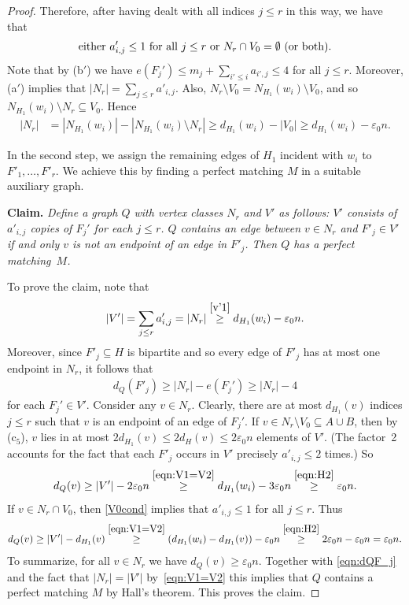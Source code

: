 \documentclass{memo-l}
\def\eps{\varepsilon}
\def\epszero{\eps_0}
\numberwithin{section}{chapter}
\numberwithin{equation}{section}
\numberwithin{firstthm}{section}
\numberwithin{figure}{section}
\begin{document}
{\begin{proof}
Therefore, after having dealt with all indices $j\le r$ in this way, we have that
\begin{align}
\textrm{either $a'_{i,j} \le 1$ for all $j \le r$ or $ N_r \cap V_0 = \emptyset$ (or both).} \label{V0cond}
\end{align}
Note that by (b$'$) we have $e(F_j') \le m_j + \sum_{i'\le i} a_{i',j} \le 4$ for all $j\le r$.
Moreover, (a$'$) implies that $|N_r| = \sum_{j \le r}  a'_{i,j}$.
Also, $N_r  \setminus V_0=N_{H_1}(w_i) \setminus V_0$, and so $N_{H_1}(w_i) \setminus N_r  \subseteq V_0$.
Hence
\begin{align}
|N_r| & = 
| N_{H_1}(w_i) | - | N_{H_1}(w_i) \setminus N_r | 
\ge d_{H_1}(w_i) - |V_0| \ge d_{H_1}(w_i) - \epszero n. 
\label{v'1}
\end{align}

In the second step, we assign the remaining edges of $H_1$ incident with $w_i$ to $F'_1,\dots,F'_r$.
We achieve this by finding a perfect matching $M$ in a suitable auxiliary graph.

\medskip

\noindent
{\bf Claim.} \emph{Define a graph $Q$ with vertex classes $N_r$ and $V'$ as follows:
$V'$ consists of $a'_{i,j}$ copies of $F_j'$ for each $ j \le r$.
$Q$ contains an edge between $v \in N_r$ and $F'_j \in V'$ if and only $v$ is not an endpoint of an edge in $F'_j$.
Then $Q$ has a perfect matching~$M$.}

\smallskip

\noindent
To prove the claim, note that 
\begin{align}\label{eqn:V1=V2}
	|V'| = \sum_{j \le r} a'_{i,j} = |N_r|  \overset{\eqref{v'1}}{\ge} d_{H_1}(w_i) - \epszero n.  
\end{align}
Moreover, since $F'_j\subseteq H$ is bipartite and so every edge of $F'_j$ has at most one endpoint in $N_r$,
it follows that
\begin{align}
d_{Q} (F'_j) \geq |N_r| - e(F_j')  \ge |N_r| -4 \label{eqn:dQF_j}
\end{align}
for each $F_j' \in V'$.
Consider any $v \in N_r$. Clearly, there are at most $d_{H_1}(v)$ indices $j\le r$ such that $v$ is an endpoint of an
edge of $F_j'$. If $v \in N_r \setminus V_0 \subseteq A \cup B$, then by (c$_5$), $v$ lies in at most
$2 d_{H_1}(v) \le 2 d_{H}(v)\le 2 \epszero n$ elements of $V'$. (The factor~2 accounts for the fact that each $F'_j$ occurs in
$V'$ precisely $a'_{i,j}\le 2$ times.) So
$$
d_{Q} (v) \geq |V'| - 2\epszero n  \overset{\eqref{eqn:V1=V2}}{\geq} d_{H_1}(w_i)- 3\epszero  n  \overset{\eqref{eqn:H2}}{\geq} \epszero n.
$$
If $v \in N_r \cap V_0$, then \eqref{V0cond} implies that $a'_{i,j} \le  1$ for all $j\le r$.
Thus
\begin{align*}
d_{Q} (v) \geq |V'| - d_{H_1}(v) \overset{\eqref{eqn:V1=V2}}{\geq} ( d_{H_1}(w_i) - d_{H_1}(v) )- \epszero n
\overset{\eqref{eqn:H2}}{\geq} 2 \epszero n  - \epszero n = \epszero n .
\end{align*}
To summarize, for all $v \in N_r$ we have $d_{Q} (v) \geq \epszero n $.
Together with \eqref{eqn:dQF_j} and the fact that $|N_r| = |V'|$ by~\eqref{eqn:V1=V2}
this implies that $Q$ contains a perfect matching $M$ by Hall's theorem.
This proves the claim.


\end{proof}}
\end{document}
